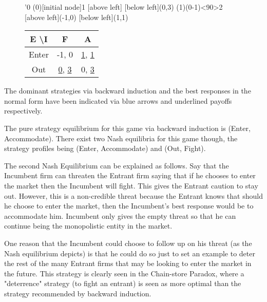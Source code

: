 \documentclass[11pt]{article}
\theoremstyle{definition}
\begin{document}
\begin{figure}[h!]
\centering
\begin{minipage}{.5\textwidth}
	\centering
	\begin{istgame}
	\setistgrowdirection'{0}
	\xtdistance{20mm}{15mm}
	\istroot(0)[initial node]{1}
		[above left]
		[below left]{(0,3)}
		\endist
	\xtdistance{20mm}{15mm}
	\istroot(1)(0-1)<90>{2}
		[above left]{(-1,0)}
		[below left]{(1,1)}
		\endist
	\end{istgame}
\end{minipage}%
\begin{minipage}{.5\textwidth}
	\centering
	\begin{tabular}{|c|c|c|}
	\hline
	E \textbackslash I & F & A \\
	\hline
	Enter & -1, 0 & \underline{1}, \underline{1} \\
	\hline
	Out & \underline{0}, \underline{3} & 0, \underline{3} \\
	\hline
	\end{tabular}
\end{minipage}
\label{fig:enin}
\end{figure}

The dominant strategies via backward induction and the best responses in the normal form have been indicated via blue arrows and underlined payoffs respectively.

The pure strategy equilibrium for this game via backward induction is (Enter, Accommodate). There exist two Nash equilibria for this game though, the strategy profiles being (Enter, Accommodate) and (Out, Fight).

The second Nash Equilibrium can be explained as follows. Say that the Incumbent firm can threaten the Entrant firm saying that if he chooses to enter the market then the Incumbent will fight. This gives the Entrant caution to stay out. However, this is a non-credible threat because the Entrant knows that should he choose to enter the market, then the Incumbent's best response would be to accommodate him. Incumbent only gives the empty threat so that he can continue being the monopolistic entity in the market.

One reason that the Incumbent could choose to follow up on his threat (as the Nash equilibrium depicts) is that he could do so just to set an example to deter the rest of the many Entrant firms that may be looking to enter the market in the future. This strategy is clearly seen in the Chain-store Paradox, where a "deterrence" strategy (to fight an entrant) is seen as more optimal than the strategy recommended by backward induction.
\end{document}
